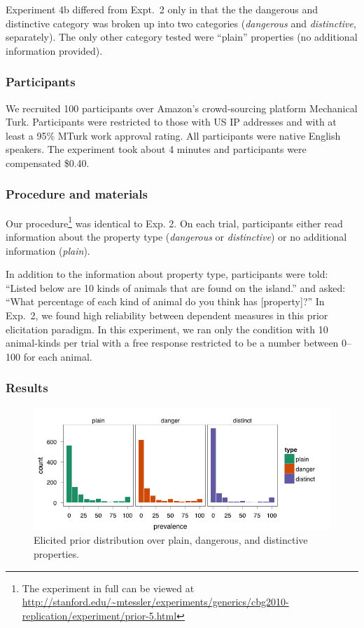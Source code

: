 \documentclass[10pt,letterpaper]{article}
\begin{document}
Experiment 4b differed from Expt.~2 only in that the the dangerous and distinctive category was broken up into two categories (\emph{dangerous} and \emph{distinctive}, separately). The only other category tested were ``plain'' properties (no additional information provided).

\subsubsection{Participants}

We recruited 100 participants over Amazon's crowd-sourcing platform Mechanical Turk. Participants were restricted to those with US IP addresses and with at least a 95\% MTurk work approval rating. All participants were native English speakers. The experiment took about 4 minutes and participants were compensated \$0.40.

\subsubsection{Procedure and materials}

Our procedure\footnote{The experiment in full can be viewed at \url{http://stanford.edu/~mtessler/experiments/generics/cbg2010-replication/experiment/prior-5.html}} was identical to Exp. 2. On each trial, participants either read information about the property type (\emph{dangerous} or \emph{distinctive}) or no additional information (\emph{plain}). 

In addition to the information about property type, participants were told: ``Listed below are 10 kinds of animals that are found on the island.'' and asked: ``What percentage of each kind of animal do you think has [property]?'' In Exp.~2, we found high reliability between dependent measures in this prior elicitation paradigm. In this experiment, we ran only the condition with 10 animal-kinds per trial with a free response restricted to be a number between 0--100 for each animal.

\subsubsection{Results}

\begin{figure}
\centering
    \includegraphics[width=0.8\columnwidth]{prior_ddp}
    \caption{Elicited prior distribution over plain, dangerous, and distinctive properties.}
  \label{fig:empiricalddp}
\end{figure}
\end{document}
